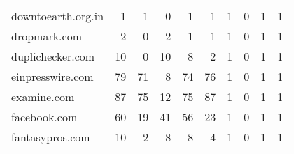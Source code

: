 \begin{tabular}{lrrrrrrrrr}
         downtoearth.org.in &                                1 &                                  1 &                                      0 &                            1 &                           1 &                                   1 &                                      0 &                             1 &                            1 \\
               dropmark.com &                                2 &                                  0 &                                      2 &                            1 &                           1 &                                   1 &                                      0 &                             1 &                            1 \\
           duplichecker.com &                               10 &                                  0 &                                     10 &                            8 &                           2 &                                   1 &                                      0 &                             1 &                            1 \\
           einpresswire.com &                               79 &                                 71 &                                      8 &                           74 &                          76 &                                   1 &                                      0 &                             1 &                            1 \\
                examine.com &                               87 &                                 75 &                                     12 &                           75 &                          87 &                                   1 &                                      0 &                             1 &                            1 \\
               facebook.com &                               60 &                                 19 &                                     41 &                           56 &                          23 &                                   1 &                                      0 &                             1 &                            1 \\
            fantasypros.com &                               10 &                                  2 &                                      8 &                            8 &                           4 &                                   1 &                                      0 &                             1 &                            1 \\

\end{tabular}
